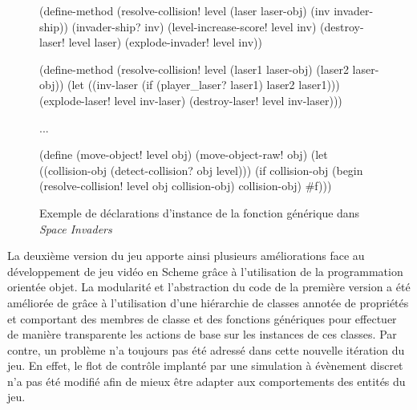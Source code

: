 \documentclass[12pt,twoside,letterpaper,francais]{book}
\newcommand{\scheme}[1]{\selectlanguage{english}{\tt #1}\selectlanguage{french}}
\begin{document}
\begin{figure}[htb!]
  \begin{schemecode}
(define-method (resolve-collision! level (laser laser-obj) 
                                         (inv invader-ship))
  (invader-ship? inv) 
  (level-increase-score! level inv)
  (destroy-laser! level laser)
  (explode-invader! level inv))

(define-method (resolve-collision! level (laser1 laser-obj)
                                         (laser2 laser-obj))
  (let ((inv-laser (if (player\_laser? laser1) laser2 laser1)))
    (explode-laser! level inv-laser)
    (destroy-laser! level inv-laser)))

...

(define (move-object! level obj)
  (move-object-raw! obj)
  (let ((collision-obj (detect-collision? obj level)))
    (if collision-obj
        (begin (resolve-collision! level obj collision-obj)
               collision-obj)
        \#f)))
  \end{schemecode}
  \caption{Exemple de déclarations d'instance de la fonction générique
    \scheme{resolve-collision!} dans \textit{Space Invaders}}
  \label{Exp:si2-genfun}
\end{figure}

La deuxième version du jeu apporte ainsi plusieurs améliorations face
au dévelop\-pement de jeu vidéo en Scheme grâce à l'utilisation de
la programmation orientée objet. La modularité et l'abstraction du
code de la première version a été améliorée de grâce à l'utilisation
d'une hiérarchie de classes annotée de propriétés et comportant des
membres de classe et des fonctions génériques pour effectuer de
manière transparente les actions de base sur les instances de ces
classes. Par contre, un problème n'a toujours pas été adressé dans
cette nouvelle itération du jeu. En effet, le flot de contrôle
implanté par une simulation à évènement discret n'a pas été modifié
afin de mieux être adapter aux comportements des entités du jeu.


\FloatBarrier
\end{document}
